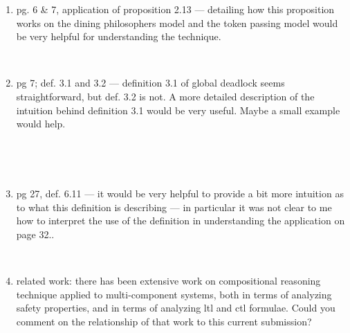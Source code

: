\begin{enumerate}
~


\item  pg. 6 \& 7, application of proposition 2.13 --- detailing how this proposition works
on the dining philosophers model and the token passing model would be very helpful
for understanding the technique.

~


\item pg 7; def. 3.1 and 3.2 --- definition 3.1 of global deadlock seems straightforward, but
def. 3.2 is not.  A more detailed description of the intuition behind definition 3.1 would
be very useful.  Maybe a small example would help.

~


~

\item pg 27, def. 6.11 --- it would be very helpful to provide a bit more
intuition as to what this definition is describing --- in particular it was not
clear to me how to interpret the use of the definition in understanding the
application on page 32..

~


\item  related work: there has been extensive work on compositional reasoning
technique applied to multi-component systems, both in terms of analyzing
safety properties, and in terms of analyzing ltl and ctl formulae. 
Could you comment
on the relationship of that work to this current submission?

~


\end{enumerate}



